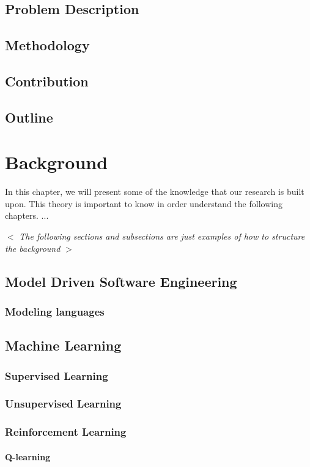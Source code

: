\documentclass[a4paper]{report}
\begin{document}
\section{Problem Description}
\section{Methodology}
\section{Contribution}
\section{Outline}

\chapter{Background} \label{Background}
In this chapter, we will present some of the knowledge that our research is built upon. This theory is important to know in order understand the following chapters.
...

$<$ \textit{The following sections and subsections are just examples of how to structure the background} $>$
\section{Model Driven Software Engineering}
\subsection{Modeling languages}\label{ModelingLanguages}

\section{Machine Learning} \label{Machine Learning}
\subsection{Supervised Learning}
\subsection{Unsupervised Learning}
\subsection{Reinforcement Learning}
\subsubsection{Q-learning} \label{Q-learning}
\end{document}
